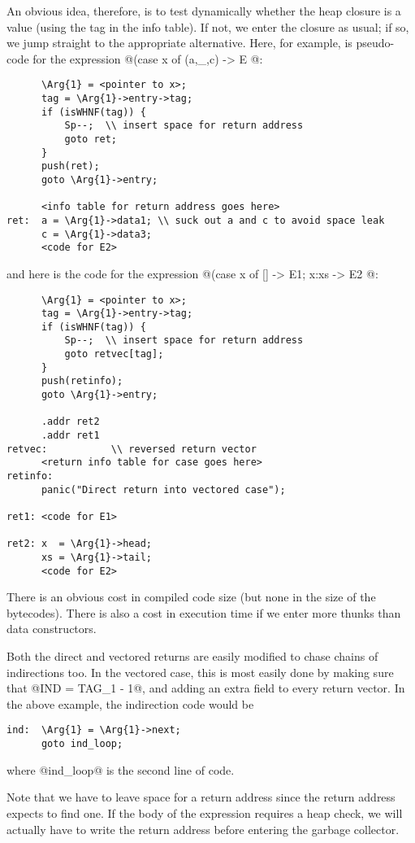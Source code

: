 \documentclass[11pt]{article}
\newcommand{\Arg}[1]{\mbox{${\tt arg}_{#1}$}}
\begin{document}
An obvious idea, therefore, is to test dynamically whether the heap
closure is a value (using the tag in the info table).  If not, we
enter the closure as usual; if so, we jump straight to the appropriate
alternative.  Here, for example, is pseudo-code for the expression
@(case x of { (a,_,c) -> E }@:
\begin{verbatim}
      \Arg{1} = <pointer to x>;
      tag = \Arg{1}->entry->tag;
      if (isWHNF(tag)) {
          Sp--;  \\ insert space for return address
          goto ret;
      }
      push(ret);           
      goto \Arg{1}->entry;
      
      <info table for return address goes here>
ret:  a = \Arg{1}->data1; \\ suck out a and c to avoid space leak
      c = \Arg{1}->data3;
      <code for E2>
\end{verbatim}
and here is the code for the expression @(case x of { [] -> E1; x:xs -> E2 }@:
\begin{verbatim}
      \Arg{1} = <pointer to x>;
      tag = \Arg{1}->entry->tag;
      if (isWHNF(tag)) {
          Sp--;  \\ insert space for return address
          goto retvec[tag];
      }
      push(retinfo);          
      goto \Arg{1}->entry;
      
      .addr ret2
      .addr ret1
retvec:           \\ reversed return vector
      <return info table for case goes here>
retinfo:
      panic("Direct return into vectored case");
      
ret1: <code for E1>

ret2: x  = \Arg{1}->head;
      xs = \Arg{1}->tail;
      <code for E2>
\end{verbatim}
There is an obvious cost in compiled code size (but none in the size
of the bytecodes).  There is also a cost in execution time if we enter
more thunks than data constructors.

Both the direct and vectored returns are easily modified to chase chains
of indirections too.  In the vectored case, this is most easily done by
making sure that @IND = TAG_1 - 1@, and adding an extra field to every
return vector.  In the above example, the indirection code would be
\begin{verbatim}
ind:  \Arg{1} = \Arg{1}->next;
      goto ind_loop;
\end{verbatim}
where @ind_loop@ is the second line of code.

Note that we have to leave space for a return address since the return
address expects to find one.  If the body of the expression requires a
heap check, we will actually have to write the return address before
entering the garbage collector.
\end{document}
